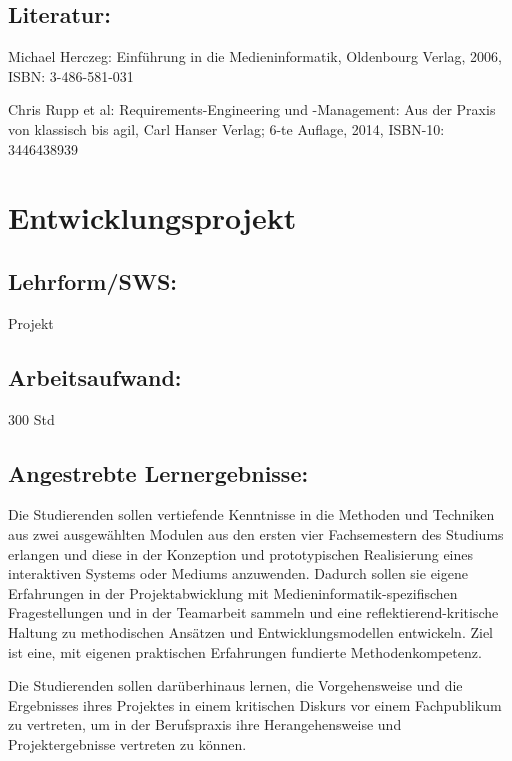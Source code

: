 \section{Literatur:}\label{literatur-9}

Michael Herczeg: Einführung in die Medieninformatik, Oldenbourg Verlag,
2006, ISBN: 3-486-581-031

Chris Rupp et al: Requirements-Engineering und -Management: Aus der
Praxis von klassisch bis agil, Carl Hanser Verlag; 6-te Auflage, 2014,
ISBN-10: 3446438939

\chapter{Entwicklungsprojekt}\label{entwicklungsprojekt}

\section{Lehrform/SWS:}\label{lehrformsws-10}

Projekt

\section{Arbeitsaufwand:}\label{arbeitsaufwand-10}

300 Std

\section{Angestrebte
Lernergebnisse:}\label{angestrebte-lernergebnisse-10}

Die Studierenden sollen vertiefende Kenntnisse in die Methoden und
Techniken aus zwei ausgewählten Modulen aus den ersten vier
Fachsemestern des Studiums erlangen und diese in der Konzeption und
prototypischen Realisierung eines interaktiven Systems oder Mediums
anzuwenden. Dadurch sollen sie eigene Erfahrungen in der
Projektabwicklung mit Medieninformatik-spezifischen Fragestellungen und
in der Teamarbeit sammeln und eine reflektierend-kritische Haltung zu
methodischen Ansätzen und Entwicklungsmodellen entwickeln. Ziel ist
eine, mit eigenen praktischen Erfahrungen fundierte Methodenkompetenz.

Die Studierenden sollen darüberhinaus lernen, die Vorgehensweise und die
Ergebnisses ihres Projektes in einem kritischen Diskurs vor einem
Fachpublikum zu vertreten, um in der Berufspraxis ihre Herangehensweise
und Projektergebnisse vertreten zu können.

